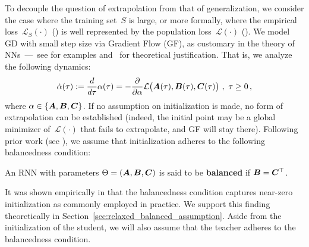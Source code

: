 To decouple the question of extrapolation from that of generalization, we consider the case where the training set~$S$ is large, or more formally, where the empirical loss~$\mathcal{L}_S ( \cdot )$ () is well represented by the population loss~$\mathcal{L} ( \cdot )$ (). 
We model GD with small step size via Gradient Flow (GF), as customary in the theory of NNs~---~see \citet{saxe2013exact, gunasekar2017implicit, arora2018optimization, arora2019implicit, lyu2019gradient, li2020towards, azulay2021implicit} for examples and~\cite{elkabetz2021continuous} for theoretical justification.
That is, we analyze the following dynamics:
\begin{equation}
    \dot{\alpha} ( \tau ) := \frac{d}{d \tau} \alpha ( \tau ) = - \frac{\partial}{\partial \alpha} \mathcal{L} \big( {\bm{A}} ( \tau ) , {\bm{B}} ( \tau ) , {\bm{C}} ( \tau ) \big)
    ~ , ~
    \tau \geq 0
    \text{\,,}
\end{equation}
where $\alpha\in\lbrace {\bm{A}},{\bm{B}},{\bm{C}} \rbrace$. 
If no assumption on initialization is made, no form of extrapolation can be established (indeed, the initial point may be a global minimizer of~$\mathcal{L} ( \cdot )$ that fails to extrapolate, and GF will stay there).
Following prior work (see \cite{cohen2022extrapolation}), we assume that initialization adheres to the following balancedness condition:
\begin{definition}\label{def:balanced}
An RNN with parameters $\Theta = ({\bm{A}},{\bm{B}},{\bm{C}})$ is said to be \textbf{balanced} if ${\bm{B}}={\bm{C}}^\top$.
\end{definition}
It was shown empirically in \cite{cohen2022extrapolation} that the balancedness condition captures near-zero initialization as commonly employed in practice.
We support this finding theoretically in Section~\ref{sec:relaxed_balanced_assumption}.
Aside from the initialization of the student, we will also assume that the teacher adheres to the balancedness condition.


